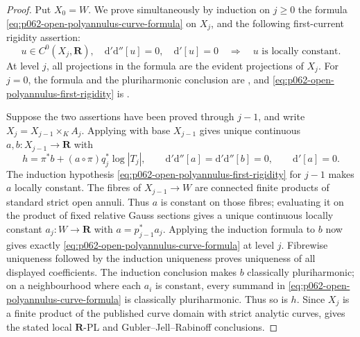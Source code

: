 \begin{proof}
Put \(X_0=W\).  We prove simultaneously by induction on \(j\geq0\) the
formula \eqref{eq:p062-open-polyannulus-curve-formula} on \(X_j\), and the
following first-current rigidity assertion:
\[
 u\in C^0(X_j,\mathbf R),\quad
 \mathrm d'\mathrm d''[u]=0,\quad\mathrm d'[u]=0
 \quad\Longrightarrow\quad u\text{ is locally constant}.
\tag{\(\clubsuit_j\)}\label{eq:p062-open-polyannulus-first-rigidity}
\]
At level \(j\), all projections in the formula are the evident projections
of \(X_j\).
For \(j=0\), the formula and the pluriharmonic conclusion are
, and
\eqref{eq:p062-open-polyannulus-first-rigidity} is
.

Suppose the two assertions have been proved through \(j-1\), and write
\(X_j=X_{j-1}\times_KA_j\).  Applying
 with base \(X_{j-1}\) gives
unique continuous \(a,b:X_{j-1}\to\mathbf R\) with
\[
 h=\pi^*b+(a\circ\pi)q_j^*\log|T_j|,
 \qquad
 \mathrm d'\mathrm d''[a]=\mathrm d'\mathrm d''[b]=0,
 \qquad \mathrm d'[a]=0.
\]
The induction hypothesis \eqref{eq:p062-open-polyannulus-first-rigidity}
for \(j-1\) makes \(a\) locally constant.  The fibres of
\(X_{j-1}\to W\) are connected finite products of standard strict open
annuli.  Thus \(a\) is constant on those fibres; evaluating it on the
product of fixed relative Gauss sections gives a unique continuous locally
constant \(a_j:W\to\mathbf R\) with
\(a=p_{j-1}^*a_j\).  Applying the induction formula to \(b\) now gives
exactly \eqref{eq:p062-open-polyannulus-curve-formula} at level \(j\).
Fibrewise uniqueness followed by the induction uniqueness proves uniqueness
of all displayed coefficients.  The induction conclusion makes \(b\)
classically pluriharmonic; on a neighbourhood where each \(a_i\) is
constant, every summand in
\eqref{eq:p062-open-polyannulus-curve-formula} is classically
pluriharmonic.  Thus so is \(h\).  Since \(X_j\) is a finite product of the
published curve domain with strict analytic curves,
 gives the stated local
\(\mathbf R\)-PL and Gubler--Jell--Rabinoff conclusions.


\end{proof}
